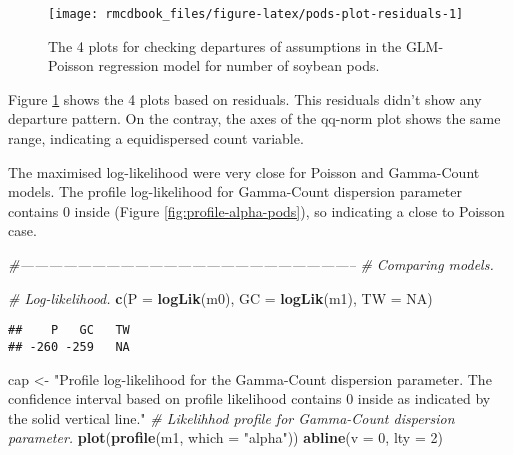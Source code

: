 \documentclass[9pt,a5paper,]{book}
\newenvironment{Shaded}{}{}
\newcommand{\KeywordTok}[1]{\textbf{{#1}}}
\newcommand{\DataTypeTok}[1]{\underline{{#1}}}
\newcommand{\DecValTok}[1]{{#1}}
\newcommand{\StringTok}[1]{{#1}}
\newcommand{\CommentTok}[1]{\textit{{#1}}}
\newcommand{\OtherTok}[1]{{#1}}
\newcommand{\NormalTok}[1]{{#1}}
\renewenvironment{Shaded}{\color{inputcolor}}{}
\renewcommand{\DataTypeTok}[1]{{#1}}
\theoremstyle{definition}
\theoremstyle{definition}
\theoremstyle{remark}
\begin{document}
\begin{figure}[h]

{\centering \texttt{[image: rmcdbook\_files/figure-latex/pods-plot-residuals-1]} 

}

\caption{The 4 plots for checking departures of assumptions in the GLM-Poisson regression model for number of soybean pods.}\label{fig:pods-plot-residuals}
\end{figure}

Figure \ref{fig:pods-plot-residuals} shows the 4 plots based on
residuals. This residuals didn't show any departure pattern. On the
contray, the axes of the qq-norm plot shows the same range, indicating a
equidispersed count variable.

The maximised log-likelihood were very close for Poisson and Gamma-Count
models. The profile log-likelihood for Gamma-Count dispersion parameter
contains 0 inside (Figure \ref{fig:profile-alpha-pods}), so indicating a
close to Poisson case.

\begin{Shaded}
\begin{Highlighting}[]
\CommentTok{#-----------------------------------------------------------------------}
\CommentTok{# Comparing models.}

\CommentTok{# Log-likelihood.}
\KeywordTok{c}\NormalTok{(}\DataTypeTok{P =} \KeywordTok{logLik}\NormalTok{(m0), }\DataTypeTok{GC =} \KeywordTok{logLik}\NormalTok{(m1), }\DataTypeTok{TW =} \OtherTok{NA}\NormalTok{)}
\end{Highlighting}
\end{Shaded}

\begin{verbatim}
##    P   GC   TW 
## -260 -259   NA
\end{verbatim}

\begin{Shaded}
\begin{Highlighting}[]
\NormalTok{cap <-}
\StringTok{    "Profile log-likelihood for the Gamma-Count dispersion parameter. The confidence interval based on profile likelihood contains 0 inside as indicated by the solid vertical line."}
\CommentTok{# Likelihhod profile for Gamma-Count dispersion parameter.}
\KeywordTok{plot}\NormalTok{(}\KeywordTok{profile}\NormalTok{(m1, }\DataTypeTok{which =} \StringTok{"alpha"}\NormalTok{))}
\KeywordTok{abline}\NormalTok{(}\DataTypeTok{v =} \DecValTok{0}\NormalTok{, }\DataTypeTok{lty =} \DecValTok{2}\NormalTok{)}
\end{Highlighting}
\end{Shaded}
\end{document}
